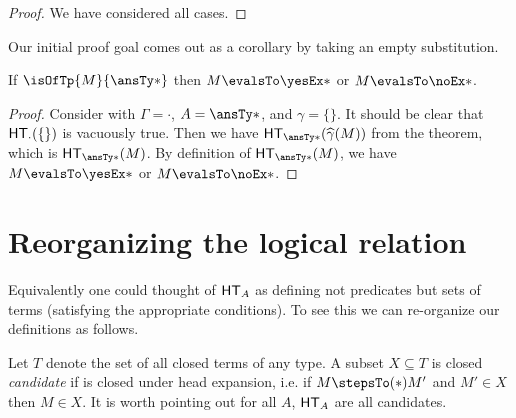 \documentclass[letterpaper]{article}
\begin{document}
\begin{proof}
We have considered all cases.
\end{proof}

Our initial proof goal comes out as a corollary by taking an empty substitution.
\begin{corollary}
  If $\isOfTp{M}{\ansTy*}$ then $M \evalsTo \yesEx*$ or $M \evalsTo \noEx*$.
\end{corollary}
\begin{proof}
  Consider  with $\Gamma = \cdot$, $A = \ansTy*$, and $\gamma = \{\}$. It should be clear that $\HT[\cdot](\{\})$ is vacuously true. Then we have $\HT[\ansTy*](\widehat{\gamma}(M))$ from the theorem, which is $\HT[\ansTy*](M)$. By definition of $\HT[\ansTy*](M)$, we have $M \evalsTo \yesEx*$ or $M \evalsTo \noEx*$.
\end{proof}

\section{Reorganizing the logical relation}

Equivalently one could thought of $\HT[A]$ as defining not predicates but sets of terms
(satisfying the appropriate conditions). To see this we can re-organize our definitions
as follows.

Let $T$ denote the set of all closed terms of any type.
A subset $X \subseteq T$ is closed \emph{candidate} if is closed under head expansion,
i.e. if $M \stepsTo(*) M'$ and $M' \in X$ then $M \in X$.
It is worth pointing out for all $A$, $\HT[A]$ are all candidates.
\end{document}
